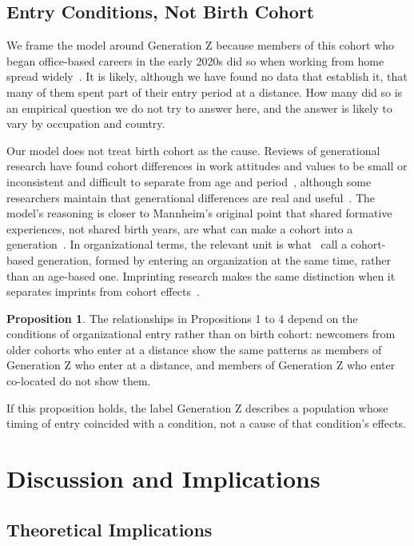 \documentclass[12pt,a4paper]{article}
\theoremstyle{definition}
\newtheorem{proposition}{Proposition}
\begin{document}
\subsection{Entry Conditions, Not Birth Cohort}

We frame the model around Generation Z because members of this cohort who began office-based careers in the early 2020s did so when working from home spread widely~\citep{kniffin2021covid}. It is likely, although we have found no data that establish it, that many of them spent part of their entry period at a distance. How many did so is an empirical question we do not try to answer here, and the answer is likely to vary by occupation and country.

Our model does not treat birth cohort as the cause. Reviews of generational research have found cohort differences in work attitudes and values to be small or inconsistent and difficult to separate from age and period~\citep{costanza2012generational,parry2011generational,rudolph2021generations}, although some researchers maintain that generational differences are real and useful~\citep{campbell2015generational}. The model's reasoning is closer to Mannheim's original point that shared formative experiences, not shared birth years, are what can make a cohort into a generation~\citep{mannheim1952problem}. In organizational terms, the relevant unit is what~\citet{joshi2010unpacking} call a cohort-based generation, formed by entering an organization at the same time, rather than an age-based one. Imprinting research makes the same distinction when it separates imprints from cohort effects~\citep{marquis2013imprinting}.

\begin{proposition}
The relationships in Propositions 1 to 4 depend on the conditions of organizational entry rather than on birth cohort: newcomers from older cohorts who enter at a distance show the same patterns as members of Generation Z who enter at a distance, and members of Generation Z who enter co-located do not show them.
\end{proposition}

If this proposition holds, the label Generation Z describes a population whose timing of entry coincided with a condition, not a cause of that condition's effects.

\section{Discussion and Implications}
\subsection{Theoretical Implications}
\end{document}
